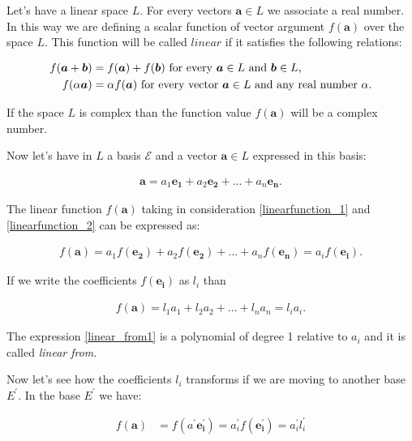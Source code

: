 \documentclass{book}
\begin{document}
Let's have a linear space $L$. For every vectors $\boldsymbol{a} \in L$ we associate a real number. In this way we are defining a scalar function of vector argument $f(\boldsymbol{a})$ over the space $L$. This function will be called $linear$ if it satisfies the following relations:

\begin{align}
f(\boldsymbol{a} + \boldsymbol{b}) &= f(\boldsymbol{a}) + f(\boldsymbol{b}) \textnormal{ for every } \boldsymbol{a} \in L \textnormal{ and } \boldsymbol{b} \in L\textnormal{,} \label{linearfunction_1} \\
f(\alpha\boldsymbol{a}) &= \alpha f(\boldsymbol{a}) \textnormal{ for every vector } \boldsymbol{a} \in L \textnormal{ and any real number } \alpha. \label{linearfunction_2}
\end{align}

If the space $L$ is complex than the function value $f(\boldsymbol{a})$ will be a complex number.

Now let's have in $L$ a basis $\mathscr{E}$ and a vector $\boldsymbol{a} \in L$ expressed in this basis:

\begin{align*}
\boldsymbol{a} = a_1\boldsymbol{e_1} + a_2\boldsymbol{e_2} + ... + a_n\boldsymbol{e_n}.
\end{align*}

The linear function $f(\boldsymbol{a})$ taking in consideration \eqref{linearfunction_1} and \eqref{linearfunction_2} can be expressed as:

\begin{align*}
f(\boldsymbol{a}) = a_{1}f(\boldsymbol{e_2}) + a_{2}f(\boldsymbol{e_2}) + ... + a_{n}f(\boldsymbol{e_n}) = a_if(\boldsymbol{e_i}). \label{linear_from0}
\end{align*}

If we write the coefficients $f(\boldsymbol{e_i})$ as $l_i$ than

\begin{align}
f(\boldsymbol{a}) = l_{1}a_{1} + l_{2}a_{2} + ... + l_{n}a_{n} = l_{i}a_{i}. \label{linear_from1}
\end{align}

The expression \eqref{linear_from1} is a polynomial of degree 1 relative to $a_i$ and it is called \emph{linear from}.

Now let's see how the coefficients $l_i$ transforms if we are moving to another base $E^'$. In the base $E^'$ we have:

\begin{align}
f(\boldsymbol{a}) &= f(a^{'}\boldsymbol{e^{'}_i}) = a^{'}_if(\boldsymbol{e^{'}_i}) = a^{'}_{i}l^{'}_i \label{linear_from_new_basis}
\end{align}
\end{document}
